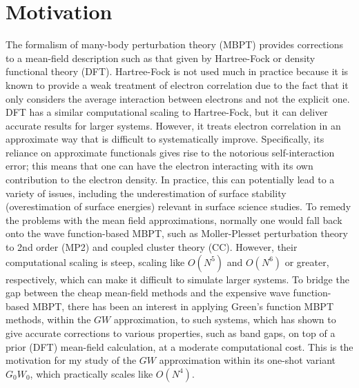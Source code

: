 \documentclass[12pt]{caltech_thesis}
\begin{document}
\chapter{Motivation}
The formalism of many-body perturbation theory (MBPT) provides corrections to a mean-field description such as that given by Hartree-Fock or density functional theory (DFT). Hartree-Fock is not used much in practice because it is known to provide a weak treatment of electron correlation due to the fact that it only considers the average interaction between electrons and not the explicit one. DFT has a similar computational scaling to Hartree-Fock, but it can deliver accurate results for larger systems. \autocite{amusia_density_2003} However, it treats electron correlation in an approximate way that is difficult to systematically improve. Specifically, its reliance on approximate functionals gives rise to the notorious self-interaction error; this means that one can have the electron interacting with its own contribution to the electron density. In practice, this can potentially lead to a variety of issues, including the underestimation of surface stability (overestimation of surface energies) relevant in surface science studies. \autocite{schimka_accurate_2010} \autocite{kozlowski_elucidating_2021} To remedy the problems with the mean field approximations, normally one would fall back onto the wave function-based MBPT, such as Moller-Plesset perturbation theory to 2nd order (MP2) and coupled cluster theory (CC). However, their computational scaling is steep, scaling like $O(N^5)$ and $O(N^6)$ or greater, respectively, which can make it difficult to simulate larger systems. \autocite{mcclain_gaussian-based_2017} To bridge the gap between the cheap mean-field methods and the expensive wave function-based MBPT, there has been an interest in applying Green's function MBPT methods, within the $GW$ approximation, to such systems, which has shown to give accurate corrections to various properties, such as band gaps, on top of a prior (DFT) mean-field calculation, at a moderate computational cost. \autocite{noauthor_frontiers_nodate} This is the motivation for my study of the $GW$ approximation within its one-shot variant $G_0W_0$, which practically scales like $O(N^4)$.
\end{document}
